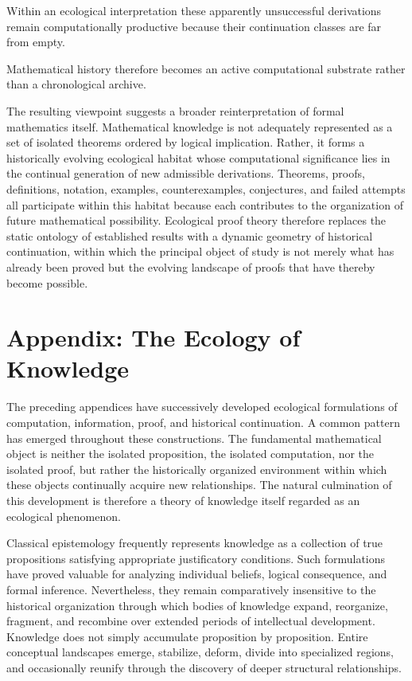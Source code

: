 \documentclass[12pt,oneside]{article}
\theoremstyle{remark}
\begin{document}
Within an ecological interpretation these apparently unsuccessful derivations
remain computationally productive because their continuation classes are far
from empty.

Mathematical history therefore becomes an active computational substrate rather
than a chronological archive.

The resulting viewpoint suggests a broader reinterpretation of formal
mathematics itself. Mathematical knowledge is not adequately represented as a
set of isolated theorems ordered by logical implication. Rather, it forms a
historically evolving ecological habitat whose computational significance lies
in the continual generation of new admissible derivations. Theorems, proofs,
definitions, notation, examples, counterexamples, conjectures, and failed
attempts all participate within this habitat because each contributes to the
organization of future mathematical possibility. Ecological proof theory
therefore replaces the static ontology of established results with a dynamic
geometry of historical continuation, within which the principal object of study
is not merely what has already been proved but the evolving landscape of proofs
that have thereby become possible.

\section{Appendix: The Ecology of Knowledge}

The preceding appendices have successively developed ecological formulations of
computation, information, proof, and historical continuation. A common pattern
has emerged throughout these constructions. The fundamental mathematical object
is neither the isolated proposition, the isolated computation, nor the isolated
proof, but rather the historically organized environment within which these
objects continually acquire new relationships. The natural culmination of this
development is therefore a theory of knowledge itself regarded as an ecological
phenomenon.

Classical epistemology frequently represents knowledge as a collection of true
propositions satisfying appropriate justificatory conditions. Such formulations
have proved valuable for analyzing individual beliefs, logical consequence, and
formal inference. Nevertheless, they remain comparatively insensitive to the
historical organization through which bodies of knowledge expand, reorganize,
fragment, and recombine over extended periods of intellectual development.
Knowledge does not simply accumulate proposition by proposition. Entire
conceptual landscapes emerge, stabilize, deform, divide into specialized
regions, and occasionally reunify through the discovery of deeper structural
relationships.
\end{document}
